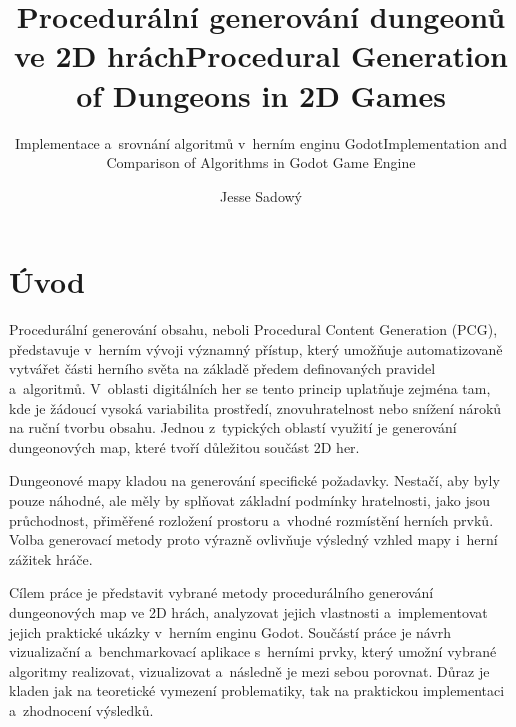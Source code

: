 \documentclass[
   program=itk,
   biblatex,
   figures=true,
   tables=true,
   glossaries,
   index
]{kidiplom}
\title{Procedurální generování dungeonů ve 2D hrách}
\title[english]{Procedural Generation of Dungeons in 2D Games}
\subtitle{Implementace a~srovnání algoritmů v~herním enginu Godot}
\subtitle[english]{Implementation and Comparison of Algorithms in Godot Game Engine}
\author{Jesse Sadowý}
\begin{document}
\maketitle



\newcommand{\BibLaTeX}{\textsc{Bib}\LaTeX}


\section{Úvod}
Procedurální generování obsahu, neboli Procedural Content Generation (PCG), představuje v~herním vývoji významný přístup, který umožňuje automatizovaně vytvářet části herního světa na základě předem definovaných pravidel a~algoritmů. V~oblasti digitálních her se tento princip uplatňuje zejména tam, kde je žádoucí vysoká variabilita prostředí, znovuhratelnost nebo snížení nároků na ruční tvorbu obsahu. Jednou z~typických oblastí využití je generování dungeonových map, které tvoří důležitou součást 2D her.

Dungeonové mapy kladou na generování specifické požadavky. Nestačí, aby byly pouze náhodné, ale měly by splňovat základní podmínky hratelnosti, jako jsou průchodnost, přiměřené rozložení prostoru a~vhodné rozmístění herních prvků. Volba generovací metody proto výrazně ovlivňuje výsledný vzhled mapy i~herní zážitek hráče.

Cílem práce je představit vybrané metody procedurálního generování dungeonových map ve 2D hrách, analyzovat jejich vlastnosti a~implementovat jejich praktické ukázky v~herním enginu Godot. Součástí práce je návrh vizualizační a~benchmarkovací aplikace s~herními prvky, který umožní vybrané algoritmy realizovat, vizualizovat a~následně je mezi sebou porovnat. Důraz je kladen jak na teoretické vymezení problematiky, tak na praktickou implementaci a~zhodnocení výsledků.
\end{document}
